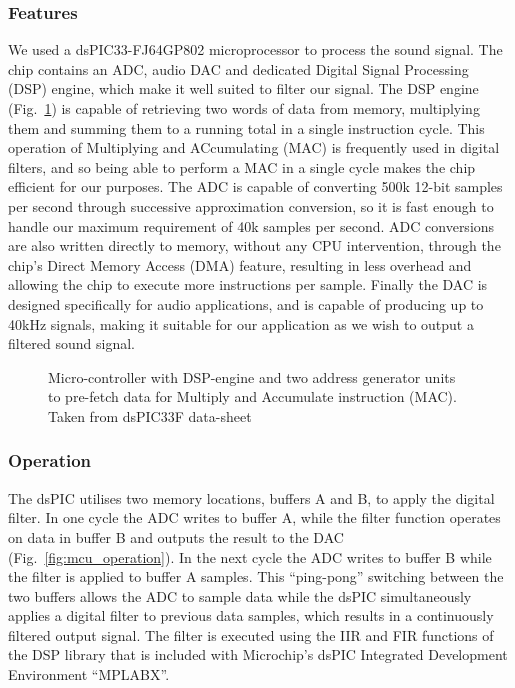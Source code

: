 \subsubsection{Features}
We used a dsPIC33-FJ64GP802 microprocessor to process the sound signal. The chip contains an ADC, audio DAC and dedicated Digital Signal Processing (DSP) engine, which make it well suited to filter our signal. The DSP engine (Fig.~\ref{fig:dsp_block}) is capable of retrieving two words of data from memory, multiplying them and summing them to a running total in a single instruction cycle. This operation of Multiplying and ACcumulating (MAC) is frequently used in digital filters, and so being able to perform a MAC in a single cycle makes the chip efficient for our purposes. The ADC is capable of converting 500k 12-bit samples per second through successive approximation conversion, so it is fast enough to handle our maximum requirement of 40k samples per second. ADC conversions are also written directly to memory, without any CPU intervention, through the chip's Direct Memory Access (DMA) feature, resulting in less overhead and allowing the chip to execute more instructions per sample. Finally the DAC is designed specifically for audio applications, and is capable of producing up to 40kHz signals, making it suitable for our application as we wish to output a filtered sound signal. 

\begin{figure}[!ht]
	\centering
	\caption{Micro-controller with DSP-engine and two address generator units to pre-fetch data for Multiply and Accumulate instruction (MAC). Taken from dsPIC33F data-sheet \cite[p.~14]{dspic_datasheet}}
	\label{fig:dsp_block}
\end{figure}

\subsubsection{Operation}
The dsPIC utilises two memory locations, buffers A and B, to apply the digital filter. In one cycle the ADC writes to buffer A, while the filter function operates on data in buffer B and outputs the result to the DAC (Fig.~\ref{fig:mcu_operation}). In the next cycle the ADC writes to buffer B while the filter is applied to buffer A samples. This ``ping-pong'' switching between the two buffers allows the ADC to sample data while the dsPIC simultaneously applies a digital filter to previous data samples, which results in a continuously filtered output signal. The filter is executed using the IIR and FIR functions of the DSP library that is included with Microchip's dsPIC Integrated Development Environment ``MPLABX''.

